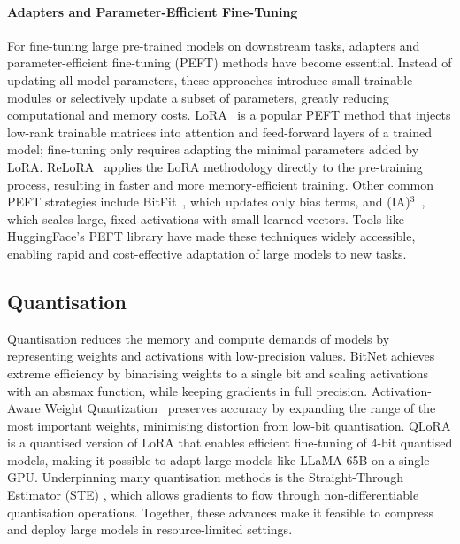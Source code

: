 \paragraph{Adapters and Parameter-Efficient Fine-Tuning}

For fine-tuning large pre-trained models on downstream tasks, adapters and parameter-efficient fine-tuning (PEFT) methods have become essential. Instead of updating all model parameters, these approaches introduce small trainable modules or selectively update a subset of parameters, greatly reducing computational and memory costs. LoRA~\citep{hu2021lora} is a popular PEFT method that injects low-rank trainable matrices into attention and feed-forward layers of a trained model; fine-tuning only requires adapting the minimal parameters added by LoRA. ReLoRA~\citep{lialin2023relora} applies the LoRA methodology directly to the pre-training process, resulting in faster and more memory-efficient training. Other common PEFT strategies include BitFit~\citep{benzaken2022bitfit}, which updates only bias terms, and (IA)$^3$~\citep{liu2022few}, which scales large, fixed activations with small learned vectors. Tools like HuggingFace's PEFT library have made these techniques widely accessible, enabling rapid and cost-effective adaptation of large models to new tasks.



\subsection{Quantisation}
Quantisation reduces the memory and compute demands of models by representing weights and activations with low-precision values. BitNet \citep{wang2023bitnet} achieves extreme efficiency by binarising weights to a single bit and scaling activations with an absmax function, while keeping gradients in full precision. Activation-Aware Weight Quantization~\citep{lin2023awq} preserves accuracy by expanding the range of the most important weights, minimising distortion from low-bit quantisation. QLoRA \citep{dettmers2023qlora} is a quantised version of LoRA that enables efficient fine-tuning of 4-bit quantised models, making it possible to adapt large models like LLaMA-65B on a single GPU. Underpinning many quantisation methods is the Straight-Through Estimator (STE) \citep{bengio2013estimating}, which allows gradients to flow through non-differentiable quantisation operations. Together, these advances make it feasible to compress and deploy large models in resource-limited settings.

